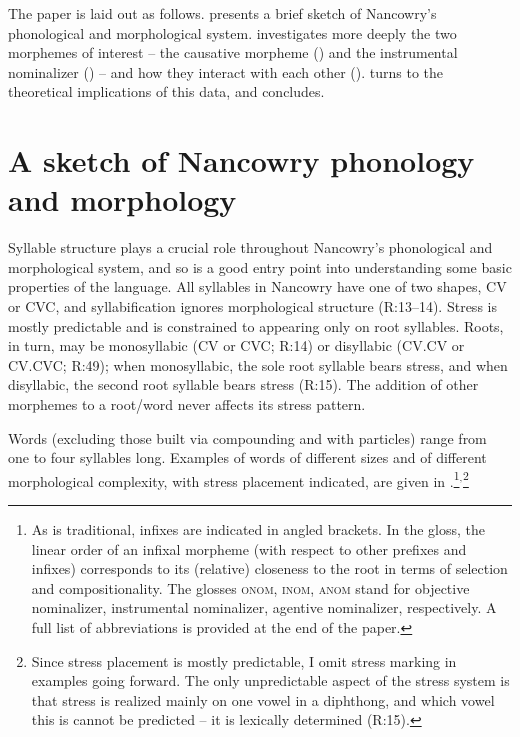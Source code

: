 \documentclass[output=paper]{langscibook}
\begin{document}
The paper is laid out as follows.  presents a brief sketch of Nancowry's phonological and morphological system.  investigates more deeply the two morphemes of interest -- the causative morpheme () and the instrumental nominalizer () -- and how they interact with each other ().  turns to the theoretical implications of this data, and  concludes.

\section{A sketch of Nancowry phonology and morphology}\label{sec:kalin:2}

Syllable structure plays a crucial role throughout Nancowry's phonological and morphological system, and so is a good entry point into understanding some basic properties of the language. All syllables in Nancowry have one of two shapes, CV or CVC, and syllabification ignores morphological structure (R:13--14). Stress is mostly predictable and is constrained to appearing only on root syllables. Roots, in turn, may be monosyllabic (CV or CVC; R:14) or disyllabic (CV.CV or CV.CVC; R:49); when monosyllabic, the sole root syllable bears stress, and when disyllabic, the second root syllable bears stress (R:15). The addition of other morphemes to a root/word never affects its stress pattern. 

Words (excluding those built via compounding and with particles) range from one to four syllables long. Examples of words of different sizes and of different morphological complexity, with stress placement indicated, are given in \Next.\footnote{As is traditional, infixes are indicated in angled brackets. In the gloss, the linear order of an infixal morpheme (with respect to other prefixes and infixes) corresponds to its (relative) closeness to the root in terms of selection and compositionality. The glosses \textsc{onom, inom, anom} stand for objective nominalizer, instrumental nominalizer, agentive nominalizer, respectively. A full list of abbreviations is provided at the end of the paper.}$^{,}$\footnote{Since stress placement is mostly predictable, I omit stress marking in examples going forward. The only unpredictable aspect of the stress system is that stress is realized mainly on one vowel in a diphthong, and which vowel this is cannot be predicted -- it is lexically determined (R:15).}
\end{document}
